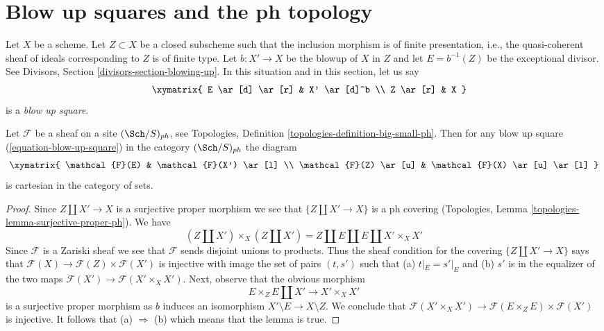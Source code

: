 \section{Blow up squares and the ph topology}
\label{section-blow-up-ph}

\noindent
Let $X$ be a scheme. Let $Z \subset X$ be a closed subscheme
such that the inclusion morphism is of finite presentation, i.e.,
the quasi-coherent sheaf of ideals corresponding to $Z$ is of
finite type. Let $b : X' \to X$ be the blowup of $X$ in $Z$
and let $E = b^{-1}(Z)$ be the exceptional divisor. See
Divisors, Section \ref{divisors-section-blowing-up}.
In this situation and in this section, let us say
\begin{equation}
\label{equation-blow-up-square}
\vcenter{
\xymatrix{
E \ar[d] \ar[r] & X' \ar[d]^b \\
Z \ar[r] & X
}
}
\end{equation}
is a {\it blow up square}.

\begin{lemma}
\label{lemma-blow-up-square-ph}
Let $\mathcal{F}$ be a sheaf on a site $(\Sch/S)_{ph}$, see
Topologies, Definition \ref{topologies-definition-big-small-ph}.
Then for any blow up square (\ref{equation-blow-up-square})
in the category $(\Sch/S)_{ph}$ the diagram
$$
\xymatrix{
\mathcal{F}(E) & \mathcal{F}(X') \ar[l] \\
\mathcal{F}(Z) \ar[u] & \mathcal{F}(X) \ar[u] \ar[l]
}
$$
is cartesian in the category of sets.
\end{lemma}

\begin{proof}
Since $Z \amalg X' \to X$ is a surjective proper morphism
we see that $\{Z \amalg X' \to X\}$ is a ph covering
(Topologies, Lemma \ref{topologies-lemma-surjective-proper-ph}).
We have
$$
(Z \amalg X') \times_X (Z \amalg X') =
Z \amalg E \amalg E \amalg X' \times_X X'
$$
Since $\mathcal{F}$ is a Zariski sheaf we see that
$\mathcal{F}$ sends disjoint unions to products.
Thus the sheaf condition for the covering
$\{Z \amalg X' \to X\}$ says that
$\mathcal{F}(X) \to \mathcal{F}(Z) \times \mathcal{F}(X')$
is injective with image the set of pairs $(t, s')$ such that
(a) $t|_E = s'|_E$ and (b) $s'$ is in the equalizer of the two maps
$\mathcal{F}(X') \to \mathcal{F}(X' \times_X X')$.
Next, observe that the obvious morphism
$$
E \times_Z E \amalg X' \longrightarrow X' \times_X X'
$$
is a surjective proper morphism as $b$ induces
an isomorphism $X' \setminus E \to X \setminus Z$. We conclude that
$\mathcal{F}(X' \times_X X') \to
\mathcal{F}(E \times_Z E) \times \mathcal{F}(X')$ is injective.
It follows that (a) $\Rightarrow$ (b) which means that the lemma is true.
\end{proof}

